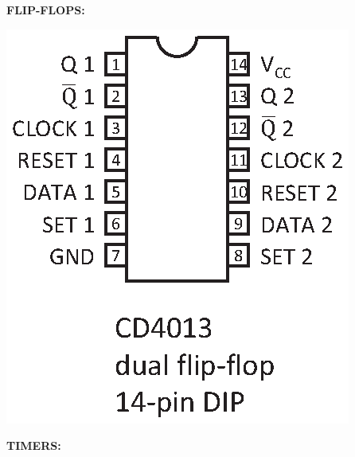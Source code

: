 \medskip
\textbf{FLIP-FLOPS:}

\hspace{0.25in}
\includegraphics[scale=0.8]{appendices/pinouts/CD4013.eps}


\medskip
\textbf{TIMERS:}

